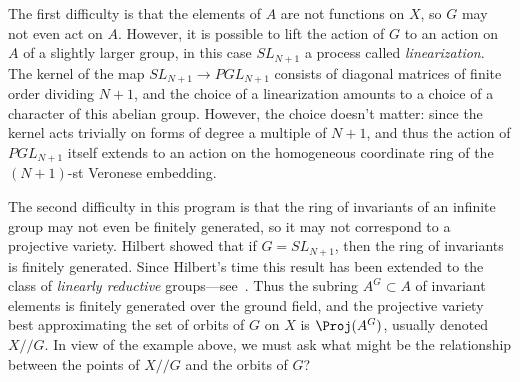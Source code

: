 The first difficulty is that the elements of $A$ are not functions on $X$, so $G$ may not even act on $A$. However, 
it is possible to lift the action of $G$ to an action on $A$ of a slightly larger group, in this case
$SL_{N+1}$ a process called \emph{linearization}. The kernel of the map $SL_{N+1} \to PGL_{N+1}$ consists of diagonal matrices of finite order dividing $N+1$, and the choice of
a linearization amounts to a choice of a character of this abelian group. However, the choice doesn't matter: since the kernel acts trivially on forms of degree a multiple
of $N+1$, and thus the action of $PGL_{N+1}$ itself  extends to an action on the homogeneous coordinate ring of the $(N+1)$-st Veronese embedding. 

The second difficulty in this program is that the ring of invariants of an infinite group may not even be finitely generated,
so it may not correspond to a projective variety. Hilbert showed that if $G= SL_{N+1}$, then the ring of invariants
is finitely generated. Since Hilbert's time this result has been extended to the class of 
\emph{linearly reductive} groups---see~\cite{MR0382294}.
Thus the subring $A^G \subset A$ of invariant elements is finitely generated over the ground field, and the projective variety best approximating the set of orbits of $G$ on $X$ 
is $\Proj(A^G)$, usually denoted $X//G$. In view of the example above, we must ask what might be
the relationship between the points of $X//G$ and the orbits of $G$? 

